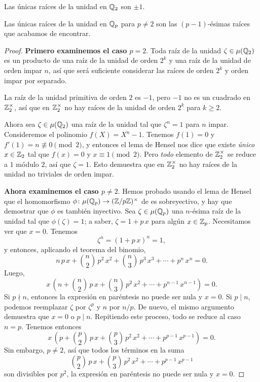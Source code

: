 \documentclass{article}
\numberwithin{equation}{section}
\theoremstyle{definition}
\begin{document}
\begin{proposicion}
  Las únicas raíces de la unidad en $\mathbb{Q}_2$ son $\pm 1$.

  Las únicas raíces de la unidad en $\mathbb{Q}_p$ para $p \ne 2$ son las
  $(p-1)$-ésimas raíces que acabamos de encontrar.

  \begin{proof}
    \noindent\textbf{Primero examinemos el caso $p = 2$}. Toda raíz de la unidad
    $\zeta \in \mu (\mathbb{Q}_2)$ es un producto de una raíz de la unidad de orden
    $2^k$ y una raíz de la unidad de orden impar $n$, así que será suficiente
    considerar las raíces de orden $2^k$ y orden impar por separado.

    La raíz de la unidad primitiva de orden $2$ es $-1$, pero $-1$ no es un
    cuadrado en $\mathbb{Z}_2^\times$, así que en $\mathbb{Z}_2^\times$ no hay raíces
    de la unidad de orden $2^k$ para $k \ge 2$.

    Ahora sea $\zeta \in \mu (\mathbb{Q}_2)$ una raíz de la unidad tal que
    $\zeta^n = 1$ para $n$ impar. Consideremos el polinomio
    $f (X) = X^n - 1$. Tenemos $f (1) = 0$ y $f' (1) = n \not\equiv 0 \pmod{2}$,
    y entonces el lema de Hensel nos dice que existe \emph{único} $x \in \mathbb{Z}_2$
    tal que $f (x) = 0$ y $x \equiv 1 \pmod{2}$. Pero \emph{todo} elemento
    de $\mathbb{Z}_2^\times$ se reduce a $1$ módulo $2$, así que $\zeta = 1$. Esto
    demuestra que en $\mathbb{Z}_2^\times$ no hay raíces de la unidad no triviales
    de orden impar.

    \vspace{1em}

    \noindent\textbf{Ahora examinemos el caso $p \ne 2$}. Hemos probado usando
    el lema de Hensel que el homomorfismo
    $\phi\colon \mu (\mathbb{Q}_p) \to (\mathbb{Z}/p\mathbb{Z})^\times$
    de  es sobreyectivo, y hay
    que demostrar que $\phi$ es también inyectivo. Sea $\zeta \in \mu (\mathbb{Q}_p)$
    una $n$-ésima raíz de la unidad tal que $\phi (\zeta) = 1$; a saber,
    $\zeta = 1 + p\,x$ para algún $x\in\mathbb{Z}_p$. Necesitamos ver que
    $x = 0$. Tenemos
    $$\zeta^n = (1 + p\,x)^n = 1,$$
    y entonces, aplicando el teorema del binomio,
    $$n\,p\,x + {n\choose 2}\,p^2\,x^2 + {n\choose 3}\,p^3\,x^3 + \cdots + p^n\,x^n = 0.$$
    Luego,
    $$x\,\left(n + {n\choose 2}\,p\,x + {n\choose 3}\,p^2\,x^2 + \cdots + p^{n-1}\,x^{n-1}\right) = 0.$$
    Si $p\nmid n$, entonces la expresión en paréntesis no puede ser nula y
    $x = 0$. Si $p\mid n$, podemos reemplazar $\zeta$ por $\zeta^p$ y $n$ por
    $n/p$. De nuevo, el mismo argumento demuestra que $x = 0$ o $p\mid
    n$. Repitiendo este proceso, todo se reduce al caso $n = p$. Tenemos
    entonces
    $$x\,\left(p + {p\choose 2}\,p\,x + {p\choose 3}\,p^2\,x^2 + \cdots + p^{p-1}\,x^{p-1}\right) = 0.$$
    Sin embargo, $p \ne 2$, así que todos los términos en la suma
    $${p\choose 2}\,p\,x + {p\choose 3}\,p^2\,x^2 + \cdots + p^{p-1}\,x^{p-1}$$
    son divisibles por $p^2$, la expresión en paréntesis no puede ser nula y $x = 0$.
  \end{proof}
\end{proposicion}
\end{document}
